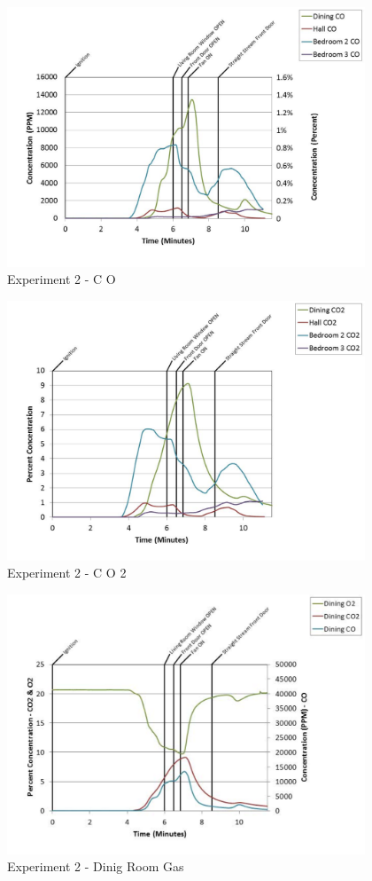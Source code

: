 \documentclass{article}
\begin{document}
\begin{appendices}
	\clearpage

	\begin{figure}[h!]
		\centering
		\includegraphics[height=3.05in]{0_Images/Results_Charts/Exp_2_Charts/CO.pdf}
		\caption{Experiment 2 - C O}
	\end{figure}
 

	\begin{figure}[h!]
		\centering
		\includegraphics[height=3.05in]{0_Images/Results_Charts/Exp_2_Charts/CO2.pdf}
		\caption{Experiment 2 - C O 2}
	\end{figure}
 
	\clearpage

	\begin{figure}[h!]
		\centering
		\includegraphics[height=3.05in]{0_Images/Results_Charts/Exp_2_Charts/DinigRoomGas.pdf}
		\caption{Experiment 2 - Dinig Room Gas}
	\end{figure}
 


\end{appendices}
\end{document}
